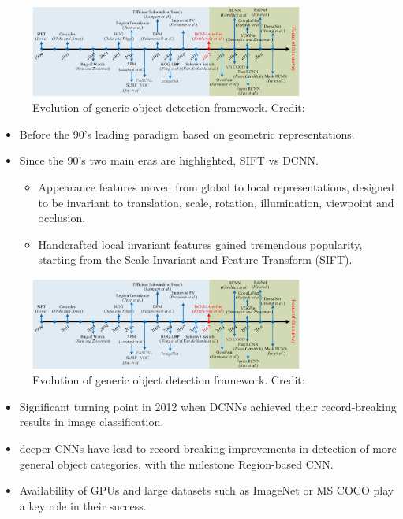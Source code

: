 \documentclass{beamer}
\begin{document}
\begin{frame}
    \begin{figure}
        \includegraphics[width=0.8\textwidth]{images/evolution.png}
        \caption{Evolution of generic object detection framework.
        \hbox{\scriptsize Credit:}
        }
    \end{figure}
    \begin{itemize}
    	\item Before the 90's leading paradigm based on geometric representations.
        \item Since the 90's two main eras are highlighted, SIFT vs DCNN.
        \begin{itemize}
        	\item Appearance features moved from global to local representations, designed to be invariant to translation, scale, rotation, illumination, viewpoint and occlusion.
        	\item Handcrafted local invariant features gained tremendous popularity, starting from the Scale Invariant and Feature Transform (SIFT).
        \end{itemize}
    \end{itemize}
\end{frame}

\begin{frame}
    \begin{figure}
        \includegraphics[width=0.8\textwidth]{images/evolution.png}
        \caption{Evolution of generic object detection framework.
        \hbox{\scriptsize Credit:}
        }
    \end{figure}
    \begin{itemize}
        \item Significant turning point in 2012 when DCNNs achieved their record-breaking results in image classification.
        \item deeper CNNs have lead to record-breaking improvements in detection of more general object categories, with the milestone Region-based CNN.
        \item Availability of GPUs and large datasets such as ImageNet \cite{russakovsky_imagenet_2015} or MS COCO \cite{lin_microsoft_2015} play a key role in their success.
    \end{itemize}
\end{frame}
\end{document}

